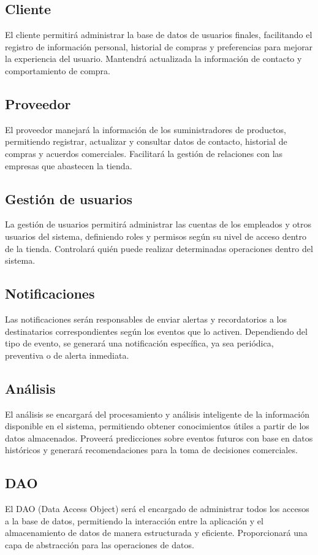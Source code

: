\documentclass{article}
\begin{document}
\subsection{Cliente}
El cliente permitirá administrar la base de datos de usuarios finales, facilitando el registro de información personal, historial de compras y preferencias para mejorar la experiencia del usuario. Mantendrá actualizada la información de contacto y comportamiento de compra.

\subsection{Proveedor}
El proveedor manejará la información de los suministradores de productos, permitiendo registrar, actualizar y consultar datos de contacto, historial de compras y acuerdos comerciales. Facilitará la gestión de relaciones con las empresas que abastecen la tienda.

\subsection{Gesti\'on de usuarios}
La gestión de usuarios permitirá administrar las cuentas de los empleados y otros usuarios del sistema, definiendo roles y permisos según su nivel de acceso dentro de la tienda. Controlará quién puede realizar determinadas operaciones dentro del sistema.

\subsection{Notificaciones}
Las notificaciones serán responsables de enviar alertas y recordatorios a los destinatarios correspondientes según los eventos que lo activen. Dependiendo del tipo de evento, se generará una notificación específica, ya sea periódica, preventiva o de alerta inmediata.

\subsection{An\'alisis}
El análisis se encargará del procesamiento y análisis inteligente de la información disponible en el sistema, permitiendo obtener conocimientos útiles a partir de los datos almacenados. Proveerá predicciones sobre eventos futuros con base en datos históricos y generará recomendaciones para la toma de decisiones comerciales.

\subsection{DAO}
El DAO (Data Access Object) será el encargado de administrar todos los accesos a la base de datos, permitiendo la interacción entre la aplicación y el almacenamiento de datos de manera estructurada y eficiente. Proporcionará una capa de abstracción para las operaciones de datos.
\end{document}
